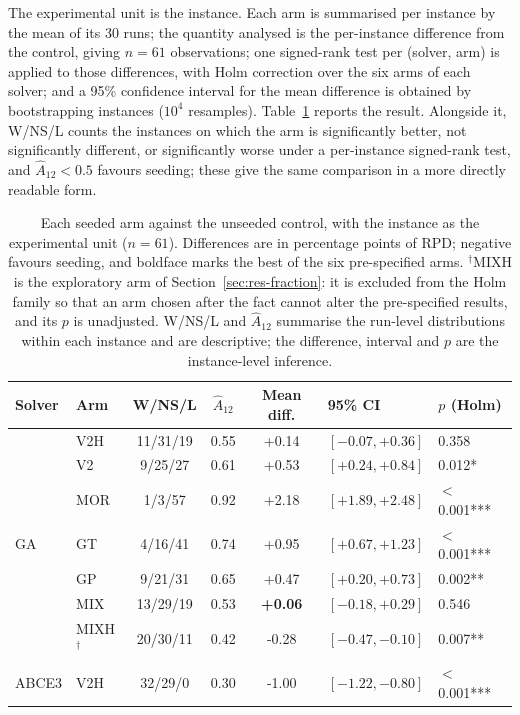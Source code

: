 \documentclass[review]{elsarticle}
\begin{document}
The experimental unit is the instance. Each arm is summarised per instance
by the mean of its 30 runs; the quantity analysed is the per-instance
difference from the control, giving $n=61$ observations; one signed-rank
test per (solver, arm) is applied to those differences, with Holm
correction over the six arms of each solver; and a 95\% confidence interval
for the mean difference is obtained by bootstrapping instances ($10^4$
resamples). Table~\ref{tab:ic} reports the result. Alongside it, W/NS/L
counts the instances on which the arm is significantly better, not
significantly different, or significantly worse under a per-instance
signed-rank test, and $\hat{A}_{12}<0.5$ favours seeding; these give the
same comparison in a more directly readable form.
\begin{table}[htbp]
\centering
\caption{Each seeded arm against the unseeded control, with the instance as
the experimental unit ($n=61$). Differences are in percentage points of RPD;
negative favours seeding, and boldface marks the best of the six
pre-specified arms. $^{\dagger}$MIXH is the exploratory arm of
Section~\ref{sec:res-fraction}: it is excluded from the Holm family so that
an arm chosen after the fact cannot alter the pre-specified results, and its
$p$ is unadjusted. W/NS/L and $\hat{A}_{12}$ summarise the run-level
distributions within each instance and are descriptive; the difference,
interval and $p$ are the instance-level inference.}
\label{tab:ic}
\footnotesize
\begin{tabular}{llccc l l}
\toprule
Solver & Arm & W/NS/L & $\hat{A}_{12}$ & Mean diff. & 95\% CI & $p$ (Holm) \\
\midrule
\multirow{7}{*}{GA}
 & V2H            & 11/31/19 & 0.55 & +0.14 & $[-0.07,+0.36]$ & 0.358 \\
 & V2             & 9/25/27 & 0.61 & +0.53 & $[+0.24,+0.84]$ & 0.012* \\
 & MOR            & 1/3/57 & 0.92 & +2.18 & $[+1.89,+2.48]$ & $<$0.001*** \\
 & GT             & 4/16/41 & 0.74 & +0.95 & $[+0.67,+1.23]$ & $<$0.001*** \\
 & GP             & 9/21/31 & 0.65 & +0.47 & $[+0.20,+0.73]$ & 0.002** \\
 & MIX            & 13/29/19 & 0.53 & \textbf{+0.06} & $[-0.18,+0.29]$ & 0.546 \\
 & MIXH$^{\dagger}$ & 20/30/11 & 0.42 & -0.28 & $[-0.47,-0.10]$ & 0.007** \\
\midrule
\multirow{7}{*}{ABCE3}
 & V2H            & 32/29/0 & 0.30 & -1.00 & $[-1.22,-0.80]$ & $<$0.001*** \\

\end{tabular}
\end{table}
\end{document}
